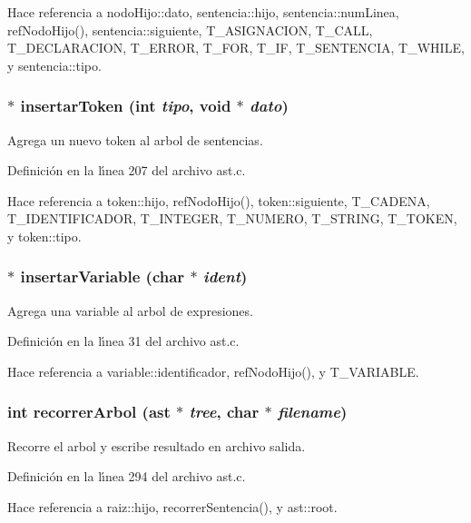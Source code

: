 Hace referencia a nodo\-Hijo::dato, sentencia::hijo, sentencia::num\-Linea, ref\-Nodo\-Hijo(), sentencia::siguiente, T\_\-ASIGNACION, T\_\-CALL, T\_\-DECLARACION, T\_\-ERROR, T\_\-FOR, T\_\-IF, T\_\-SENTENCIA, T\_\-WHILE, y sentencia::tipo.
\subsubsection{$\ast$ insertar\-Token (int {\em tipo}, void $\ast$ {\em dato})}\label{ast_8c_a14}


Agrega un nuevo token al arbol de sentencias. 



Definici\'{o}n en la l\'{\i}nea 207 del archivo ast.c.

Hace referencia a token::hijo, ref\-Nodo\-Hijo(), token::siguiente, T\_\-CADENA, T\_\-IDENTIFICADOR, T\_\-INTEGER, T\_\-NUMERO, T\_\-STRING, T\_\-TOKEN, y token::tipo.
\subsubsection{$\ast$ insertar\-Variable (char $\ast$ {\em ident})}\label{ast_8c_a3}


Agrega una variable al arbol de expresiones. 



Definici\'{o}n en la l\'{\i}nea 31 del archivo ast.c.

Hace referencia a variable::identificador, ref\-Nodo\-Hijo(), y T\_\-VARIABLE.
\subsubsection{\setlength{\rightskip}{0pt plus 5cm}int recorrer\-Arbol ({\bf ast} $\ast$ {\em tree}, char $\ast$ {\em filename})}\label{ast_8c_a20}


Recorre el arbol y escribe resultado en archivo salida. 



Definici\'{o}n en la l\'{\i}nea 294 del archivo ast.c.

Hace referencia a raiz::hijo, recorrer\-Sentencia(), y ast::root.
